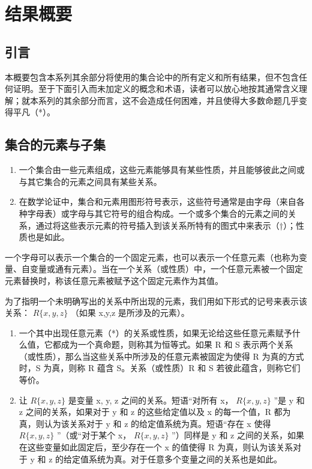 \chapter*{结果概要}
{}

\section*{引言}
{}
\setcounter{section}{0}

本概要包含本系列其余部分将使用的集合论中的所有定义和所有结果，但不包含任何证明。至于下面引入而未加定义的概念和术语，读者可以放心地按其通常含义理解；就本系列的其余部分而言，这不会造成任何困难，并且使得大多数命题几乎变得平凡（*）。

\section{集合的元素与子集}

\begin{enumerate}
\def\labelenumi{\arabic{enumi}.}
\item
  一个集合由一些元素组成，这些元素能够具有某些性质，并且能够彼此之间或与其它集合的元素之间具有某些关系。
\item
  在数学论证中，集合和元素用图形符号表示，这些符号通常是由字母（来自各种字母表）或字母与其它符号的组合构成。一个或多个集合的元素之间的关系，通过将这些表示元素的符号插入到该关系所特有的图式中来表示（†）；性质也是如此。
\end{enumerate}

一个字母可以表示一个集合的一个固定元素，也可以表示一个任意元素（也称为变量、自变量或通有元素）。当在一个关系（或性质）中，一个任意元素被一个固定元素替换时，称该任意元素被赋予这个固定元素作为其值。

为了指明一个未明确写出的关系中所出现的元素，我们用如下形式的记号来表示该关系： \(R\{x,y,z\}\) （如果 x,y,z 是所涉及的元素）。

\begin{enumerate}
\def\labelenumi{\arabic{enumi}.}
\setcounter{enumi}{2}
\item
  一个其中出现任意元素（*）的关系或性质，如果无论给这些任意元素赋予什么值，它都成为一个真命题，则称其为恒等式。如果 R 和 S 表示两个关系（或性质），那么当这些关系中所涉及的任意元素被固定为使得 R 为真的方式时，S 为真，则称 R 蕴含 S。关系（或性质）R 和 S 若彼此蕴含，则称它们等价。
\item
  让 \(R\{x, y, z\}\) 是变量 x, y, z 之间的关系。短语“对所有 x， \(R\{x, y, z\}\) ”是 y 和 z 之间的关系，如果对于 y 和 z 的这些给定值以及 x 的每一个值，R 都为真，则认为该关系对于 y 和 z 的给定值系统为真。短语“存在 x 使得 \(R\{x, y, z\}\) ”（或“对于某个 x， \(R\{x, y, z\}\) ”）同样是 y 和 z 之间的关系，如果在这些变量如此固定后，至少存在一个 x 的值使得 R 为真，则认为该关系对于 y 和 z 的给定值系统为真。对于任意多个变量之间的关系也是如此。
\end{enumerate}

